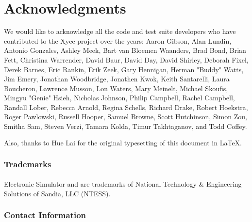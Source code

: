 


\chapter*{Acknowledgments}

We would like to acknowledge all the code and test suite developers who have
contributed to the Xyce project over the years: 
Aaron Gibson,
Alan Lundin,
Antonio Gonzales,
Ashley Meek,
Bart van Bloemen Waanders,
Brad Bond,
Brian Fett,
Christina Warrender,
David Baur,
David Day,
David Shirley,
Deborah Fixel,
Derek Barnes,
Eric Rankin,
Erik Zeek,
Gary Hennigan,
Herman "Buddy" Watts,
Jim Emery,
Jonathan Woodbridge,
Jonathen Kwok,
Keith Santarelli,
Laura Boucheron,
Lawrence Musson,
Lon Waters,
Mary Meinelt,
Michael Skoufis,
Mingyu \mbox{"Genie"} Hsieh,
Nicholas Johnson,
Philip Campbell,
Rachel Campbell,
Randall Lober,
Rebecca Arnold,
Regina Schells,
Richard Drake,
Robert Hoekstra,
Roger Pawlowski,
Russell Hooper,
Samuel Browne,
Scott Hutchinson,
Simon Zou,
Smitha Sam,
Steven Verzi,
Tamara Kolda,
Timur Takhtaganov, and
Todd Coffey.

\noindent
Also, thanks to Hue Lai for the original typesetting of this document in \LaTeX.

\subsection*{Trademarks}

\Xyce{} Electronic Simulator\textsuperscript{\scriptsize{\texttrademark}} and
\XyceTM{} are trademarks of National Technology \& Engineering Solutions of
Sandia, LLC (NTESS).

\subsection*{Contact Information} \label{Contact Information}

